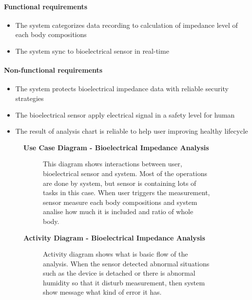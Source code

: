 \documentclass{article}
\begin{document}
		\paragraph{Functional requirements}
		\begin{itemize}
			\item The system categorizes data recording to calculation of impedance level of each body compositions
			\item The system sync to bioelectrical sensor in real-time
		\end{itemize}
		
		\paragraph{Non-functional requirements}
		\begin{itemize}
			\item The system protects bioelectrical impedance data with reliable security strategies
			\item The bioelectrical sensor apply electrical signal in a safety level for human
			\item The result of analysis chart is reliable to help user improving healthy lifecycle
		\end{itemize}
		\newpage
		
		\begin{figure}[htbp]
			\textbf{Use Case Diagram - Bioelectrical Impedance Analysis}
			\centering
			\begin{subfigure}{\textwidth}
				\resizebox{\textwidth}{!}{}
			\end{subfigure}
			\begin{subfigure}{\textwidth}
				This diagram shows interactions between user, bioelectrical sensor and system. Most of the operations are done by system, but sensor is containing lots of tasks in this case. When user triggers the measurement, sensor measure each body compositions and system analise how much it is included and ratio of whole body.
			\end{subfigure}
		\end{figure}
		\clearpage
		
		\begin{figure}[htbp]
			\textbf{Activity Diagram - Bioelectrical Impedance Analysis}
			\centering
			\begin{subfigure}{\textwidth}
				\centering
				\scalebox{1.0}{}
			\end{subfigure}
			\begin{subfigure}{\textwidth}
				Activity diagram shows what is basic flow of the analysis. When the sensor detected abnormal situations such as the device is detached or there is abnormal humidity so that it disturb measurement, then system show message what kind of error it has.
			\end{subfigure}
		\end{figure}
		\clearpage
		
\end{document}
